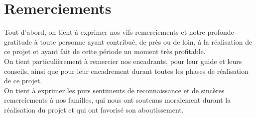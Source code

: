 \documentclass[12pt,a4paper]{report}
\makeatletter
\newcommand\mainmatter{%
	\cleardoublepage
	\pagenumbering{arabic}}
\makeatother
\begin{document}
	\restoregeometry
	\normalsize
	\clearpage
	\mainmatter


	\begingroup
	  \pagestyle{empty}
	  \null
	  \newpage
	\endgroup
	
	
	

	\chapter*{Remerciements}
	
Tout d’abord, on tient à exprimer nos vifs remerciements et notre profonde gratitude à toute personne ayant contribué, de près ou de loin, à la réalisation de ce projet et ayant fait de cette période un moment très profitable.\\
	\newline
On tient particulièrement à remercier nos encadrants, pour leur guide et leurs conseils, ainsi que pour leur encadrement durant toutes les phases de réalisation de ce projet.\\
	\newline
On tient à exprimer les purs sentiments de reconnaissance et de sincères remerciements à nos familles, qui nous ont soutenus moralement durant la réalisation du projet et qui ont favorisé son aboutissement.\\





\end{document}
